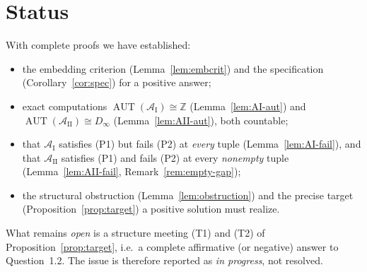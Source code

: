 \documentclass[12pt,fullpage]{article}
\theoremstyle{definition}
\newcommand{\A}{\mathcal{A}}
\newcommand{\Z}{{\mathbb{Z}}}
\newcommand{\AUT}{\operatorname{AUT}}
\begin{document}
\section{Status}

With complete proofs we have established:
\begin{itemize}
\item the embedding criterion (Lemma~\ref{lem:embcrit}) and the specification
  (Corollary~\ref{cor:spec}) for a positive answer;
\item exact computations $\AUT(\A_{\mathrm{I}})\cong\Z$
  (Lemma~\ref{lem:AI-aut}) and $\AUT(\A_{\mathrm{II}})\cong D_\infty$
  (Lemma~\ref{lem:AII-aut}), both countable;
\item that $\A_{\mathrm{I}}$ satisfies (P1) but fails (P2) at \emph{every} tuple
  (Lemma~\ref{lem:AI-fail}), and that $\A_{\mathrm{II}}$ satisfies (P1) and fails
  (P2) at every \emph{nonempty} tuple (Lemma~\ref{lem:AII-fail},
  Remark~\ref{rem:empty-gap});
\item the structural obstruction (Lemma~\ref{lem:obstruction}) and the precise
  target (Proposition~\ref{prop:target}) a positive solution must realize.
\end{itemize}
What remains \emph{open} is a structure meeting (T1) and (T2) of
Proposition~\ref{prop:target}, i.e.\ a complete affirmative (or negative) answer
to Question~1.2.  The issue is therefore reported as \emph{in progress}, not
resolved.
\end{document}
